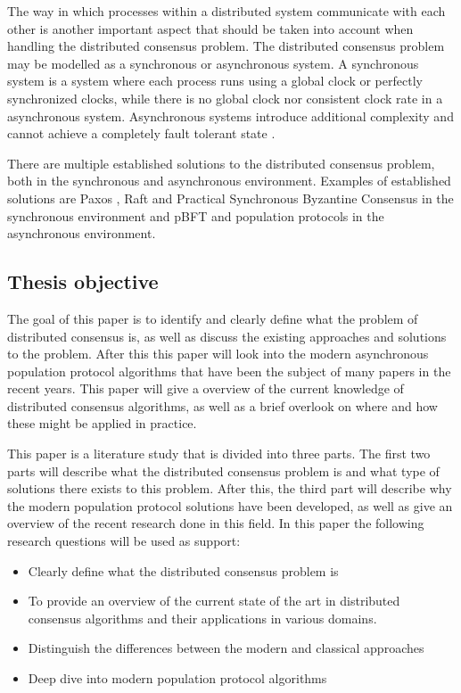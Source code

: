 The way in which processes within a distributed system communicate with each other is another important aspect that should be taken into account when handling the distributed consensus problem. The distributed consensus problem may be modelled as a synchronous or asynchronous system. A synchronous system is a system where each process runs using a global clock or perfectly synchronized clocks, while there is no global clock nor consistent clock rate in a asynchronous system. Asynchronous systems introduce additional complexity and cannot achieve a completely fault tolerant state \cite{fischerImpossibilityDistributedConsensus}.

There are multiple established solutions to the distributed consensus problem, both in the synchronous and asynchronous environment. Examples of established solutions are Paxos \cite{lamportFastPaxos2006}, Raft \cite{ongaroSearchUnderstandableConsensus} and Practical Synchronous Byzantine Consensus \cite{renPracticalSynchronousByzantine} in the synchronous environment and pBFT \cite{castroPracticalByzantineFault} and population protocols \cite{aspnesIntroductionPopulationProtocols2009} in the asynchronous environment.

\clearpage

\subsection{Thesis objective}
The goal of this paper is to identify and clearly define what the problem of distributed consensus is,
as well as discuss the existing approaches and solutions to the problem. After this this paper will look into the modern asynchronous population protocol algorithms that have been the subject of many papers in the recent years. 
This paper will give a overview of the current knowledge of distributed consensus algorithms, as well as a brief overlook on where and how these might be applied in practice.

This paper is a literature study that is divided into three parts. The first two parts will describe what the distributed consensus problem is and what type of solutions there exists to this problem. After this, the third part will describe why the modern population protocol solutions have been developed, as well as give an overview of the recent research done in this field. In this paper the following research questions will be used as support:

\begin{itemize}
    \item Clearly define what the distributed consensus problem is
    \item To provide an overview of the current state of the art in distributed consensus algorithms and their applications in various domains.
    \item Distinguish the differences between the modern and classical approaches
    \item Deep dive into modern population protocol algorithms
\end{itemize}

\clearpage